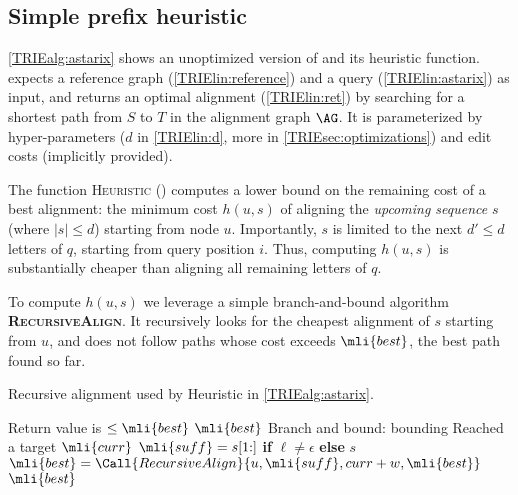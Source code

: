 
%

\subsection{Simple prefix heuristic} \label{TRIEsubsec:astarix-heuristic}

\cref{TRIEalg:astarix} shows an unoptimized version of \astarix and its heuristic
function.
%
\astarix expects a reference graph (\cref{TRIElin:reference}) and a query
(\cref{TRIElin:astarix}) as input, and returns an optimal alignment (\cref{TRIElin:ret})
by searching for a shortest path from $S$ to $T$ in the alignment graph $\AG$.
It is parameterized by hyper-parameters ($d$ in \cref{TRIElin:d}, more in
\cref{TRIEsec:optimizations}) and edit costs (implicitly provided).

The function \textsc{Heuristic}
() computes a lower bound on
the remaining cost of a best alignment: the minimum cost $h(u,s)$ of aligning
the \emph{upcoming sequence} $s$ (where $\lvert s \rvert \leq d$) starting from
node $u$. Importantly, $s$ is limited to the next $d' \leq d$ letters of $q$,
starting from query position $i$. Thus, computing $h(u,s)$ is substantially
cheaper than aligning all remaining letters of $q$.

To compute $h(u,s)$ we leverage a simple branch-and-bound algorithm
\textbf{\textsc{RecursiveAlign}}. It recursively looks for the cheapest
alignment of $s$ starting from $u$, and does not follow paths whose cost exceeds
$\mli{best}$, the best path found so far.

\begin{algorithm}[H]
	\caption{Recursive alignment used by Heuristic in \cref{TRIEalg:astarix}.}\label{TRIEalg:recursiveAlign}
	\begin{algorithmic}[1]
		\Statex
			 \Comment
			Return value is $\leq \mli{best}$
				\State \Return $\mli{best}$
				\Comment Branch and bound: bounding
			\EndIf
				\Comment Reached a target
				\State \Return $\mli{curr}$
			\EndIf
				\State $\mli{suff} = s[1{:}]$ \textbf{if} $\ell \neq \epsilon$ \textbf{else} $s$
				\State $\mli{best} = \Call{RecursiveAlign}{u, \mli{suff}, curr + w, \mli{best}}$
			\EndFor
			\State \Return $\mli{best}$
		\EndFunction
	\end{algorithmic}
\end{algorithm}

